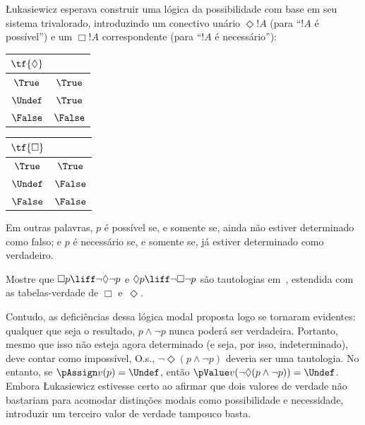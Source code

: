 \documentclass[../../../include/open-logic-section]{subfiles}
\begin{document}
\L ukasiewicz esperava construir uma lógica da possibilidade com base em seu
sistema trivalorado, introduzindo um conectivo unário $\Diamond
!A$ (para ``$!A$ é possível'') e um $\Box !A$ correspondente (para ``$!A$
é necessário''):
\begin{center}
  \begin{tabular}{c|c} 
    $\tf{\Diamond}$ & \\ 
    \hline  
    $\True$ & $\True$ \\ 
    $\Undef$ & $\True$ \\
    $\False$ & $\False$ 
  \end{tabular}
  \quad
  \begin{tabular}{c|c} 
    $\tf{\Box}$ & \\ 
    \hline  
    $\True$ & $\True$ \\ 
    $\Undef$ & $\False$ \\
    $\False$ & $\False$ 
  \end{tabular}
\end{center}
Em outras palavras, $p$ é possível se, e somente se, ainda não estiver determinado como falso;
e $p$ é necessário se, e somente se, já estiver determinado como verdadeiro.

\begin{prob}
  Mostre que $\Box p \liff \lnot\Diamond \lnot p$ e $\Diamond p \liff
  \lnot \Box \lnot p$ são tautologias em~\LogLuk[3], estendida com as
  tabelas-verdade de $\Box$ e~$\Diamond$.
\end{prob}

Contudo, as deficiências dessa lógica modal proposta logo se tornaram
evidentes: qualquer que seja o resultado, $p \land \lnot p$ nunca poderá
ser verdadeira. Portanto, mesmo que isso não esteja agora determinado (e seja, por isso,
indeterminado), deve contar como impossível, O.s.\@, $\lnot \Diamond(p
\land \lnot p)$ deveria ser uma tautologia. No entanto, se $\pAssign v(p) =
\Undef$, então $\pValue v(\lnot \Diamond(p \land \lnot p)) =
\Undef$. Embora \L ukasiewicz estivesse certo ao afirmar que dois valores de
verdade não bastariam para acomodar distinções modais como
possibilidade e necessidade, introduzir um terceiro valor de verdade tampouco
basta.
\end{document}
